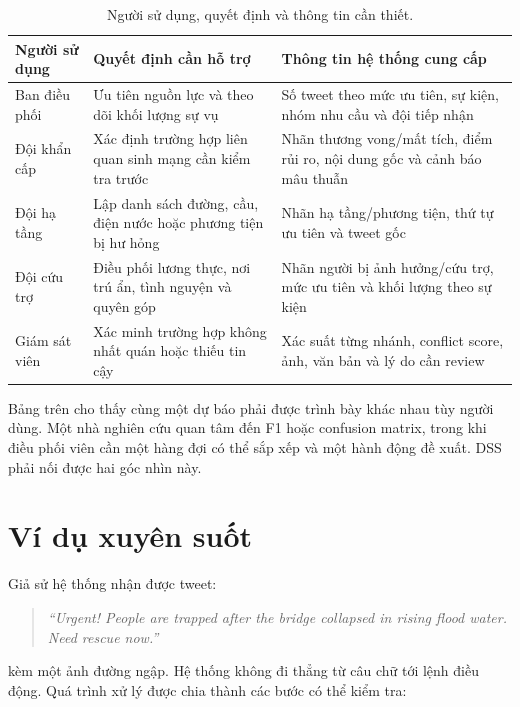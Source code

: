 \begin{table}[H]
\centering
\small
\caption{Người sử dụng, quyết định và thông tin cần thiết.}
\begin{tabularx}{\textwidth}{p{3.2cm}p{4.6cm}X}
\toprule
\textbf{Người sử dụng} & \textbf{Quyết định cần hỗ trợ} &
\textbf{Thông tin hệ thống cung cấp}\\
\midrule
Ban điều phối & Ưu tiên nguồn lực và theo dõi khối lượng sự vụ &
Số tweet theo mức ưu tiên, sự kiện, nhóm nhu cầu và đội tiếp nhận\\
Đội khẩn cấp & Xác định trường hợp liên quan sinh mạng cần kiểm tra trước &
Nhãn thương vong/mất tích, điểm rủi ro, nội dung gốc và cảnh báo mâu thuẫn\\
Đội hạ tầng & Lập danh sách đường, cầu, điện nước hoặc phương tiện bị hư hỏng &
Nhãn hạ tầng/phương tiện, thứ tự ưu tiên và tweet gốc\\
Đội cứu trợ & Điều phối lương thực, nơi trú ẩn, tình nguyện và quyên góp &
Nhãn người bị ảnh hưởng/cứu trợ, mức ưu tiên và khối lượng theo sự kiện\\
Giám sát viên & Xác minh trường hợp không nhất quán hoặc thiếu tin cậy &
Xác suất từng nhánh, conflict score, ảnh, văn bản và lý do cần review\\
\bottomrule
\end{tabularx}
\end{table}

Bảng trên cho thấy cùng một dự báo phải được trình bày khác nhau tùy người dùng.
Một nhà nghiên cứu quan tâm đến F1 hoặc confusion matrix, trong khi điều phối
viên cần một hàng đợi có thể sắp xếp và một hành động đề xuất. DSS phải nối được
hai góc nhìn này.

\section{Ví dụ xuyên suốt}

Giả sử hệ thống nhận được tweet:

\begin{quote}
\emph{``Urgent! People are trapped after the bridge collapsed in rising flood
water. Need rescue now.''}
\end{quote}

kèm một ảnh đường ngập. Hệ thống không đi thẳng từ câu chữ tới lệnh điều động.
Quá trình xử lý được chia thành các bước có thể kiểm tra:

